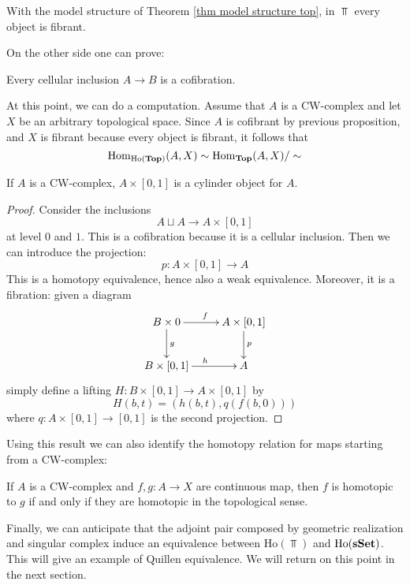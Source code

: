 \begin{cor}
With the model structure of Theorem \ref{thm model structure top}, in $\Top$ every object is fibrant.
\end{cor}

On the other side one can prove:

\begin{lemma}
Every cellular inclusion $A \to B$ is a cofibration.
\end{lemma}

At this point, we can do a computation. Assume that $A$ is a CW-complex and let $X$ be an arbitrary topological space. Since $A$ is cofibrant by previous proposition, and $X$ is fibrant because every object is fibrant, it follows that
\[
\mathrm{Hom}_{\mathrm{Ho}(\mathbf{Top})}(A,X) \sim \mathrm{Hom}_{\mathbf{Top}}(A,X) / \sim
\]

\begin{prop}
If $A$ is a CW-complex, $A \times [0,1]$ is a cylinder object for $A$.
\end{prop}

\begin{proof}
Consider the inclusions
\[
A \sqcup A \to A \times [0,1]
\]
at level $0$ and $1$. This is a cofibration because it is a cellular inclusion. Then we can introduce the projection:
\[
p \colon A \times [0,1] \to A
\]
This is a homotopy equivalence, hence also a weak equivalence. Moreover, it is a fibration: given a diagram
\[
\xymatrix{
B \times 0 \ar[d]^g \ar[r]^f & A \times [0,1] \ar[d]^p \\ B \times [0,1] \ar[r]^h & A
}
\]
simply define a lifting $H \colon B \times [0,1] \to A \times [0,1]$ by
\[
H(b,t) = (h(b,t),q(f(b,0)))
\]
where $q \colon A \times [0,1] \to [0,1]$ is the second projection.
\end{proof}

Using this result we can also identify the homotopy relation for maps starting from a CW-complex:

\begin{prop}
If $A$ is a CW-complex and $f,g \colon A \to X$ are continuous map, then $f$ is homotopic to $g$ if and only if they are homotopic in the topological sense.
\end{prop}

Finally, we can anticipate that the adjoint pair composed by geometric realization and singular complex induce an equivalence between $\mathrm{Ho}(\Top)$ and $\mathrm{Ho}(\mathbf{sSet})$. This will give an example of Quillen equivalence. We will return on this point in the next section.

